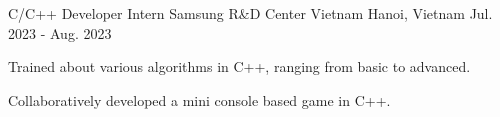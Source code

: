 

\begin{cventries}

  \cventry
    {C/C++ Developer Intern} %
    {Samsung R\&D Center Vietnam} %
    {Hanoi, Vietnam} %
    {Jul. 2023 - Aug. 2023} %
    {
      \begin{cvitems} %
        \item {Trained about various algorithms in C++, ranging from basic to advanced.}
        \item {Collaboratively developed a mini console based game in C++.}
      \end{cvitems}
    }

\end{cventries}
